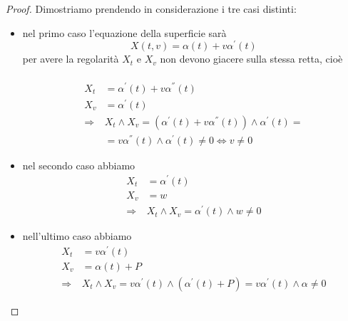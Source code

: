 \begin{proof} Dimostriamo prendendo in considerazione i tre casi distinti:
\begin{itemize}
 \item nel primo caso l'equazione della superficie sarà
$$X(t,v)=\alpha(t)+v\alpha^{'}(t)$$
per avere la regolarità $X_t$ e $X_v$ non devono giacere sulla stessa retta, cioè
\\\\
\begin{align*}
X_t&=\alpha^{'}(t)+v\alpha^{''}(t)\\
X_v&=\alpha^{'}(t)\\
\Rightarrow& X_t\wedge X_v=(\alpha^{'}(t)+v\alpha^{''}(t))\wedge \alpha^{'}(t)=\\
&=v\alpha^{''}(t)\wedge \alpha^{'}(t)\neq0 \Longleftrightarrow v\neq0
\end{align*}

\item nel secondo caso abbiamo
\begin{align*}
X_t&=\alpha^{'}(t)\\
X_v&=w\\
\Rightarrow& X_t\wedge X_v=\alpha^{'}(t)\wedge w\neq0
\end{align*}
\item nell'ultimo caso abbiamo
\begin{align*}
X_t&=v\alpha^{'}(t)\\
X_v&=\alpha(t)+P\\
\Rightarrow& X_t\wedge X_v=v\alpha^{'}(t)\wedge(\alpha^{'}(t)+P)=v\alpha^{'}(t)\wedge\alpha\neq0
\end{align*}

\end{itemize}
\end{proof}
